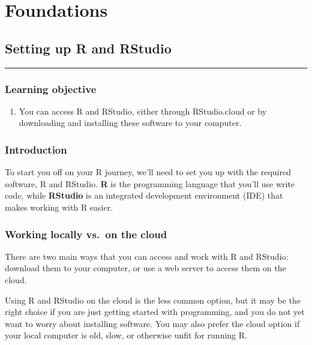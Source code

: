 \documentclass[
  letterpaper,
  DIV=11,
  numbers=noendperiod]{scrreprt}
\providecommand{\tightlist}{%
  \setlength{\itemsep}{0pt}\setlength{\parskip}{0pt}}\usepackage{longtable,booktabs,array}
\begin{document}
\part{Foundations}

\chapter{Setting up R and RStudio}\label{setting-up-r-and-rstudio}

\begin{center}\rule{0.5\linewidth}{0.5pt}\end{center}

\section*{Learning objective}\label{learning-objective}


\begin{enumerate}
\def\labelenumi{\arabic{enumi}.}
\tightlist
\item
  You can access R and RStudio, either through RStudio.cloud or by
  downloading and installing these software to your computer.
\end{enumerate}

\section{Introduction}\label{introduction-1}

To start you off on your R journey, we'll need to set you up with the
required software, R and RStudio. \textbf{R} is the programming language
that you'll use write code, while \textbf{RStudio} is an integrated
development environment (IDE) that makes working with R easier.

\section{Working locally vs.~on the
cloud}\label{working-locally-vs.-on-the-cloud}

There are two main ways that you can access and work with R and RStudio:
download them to your computer, or use a web server to access them on
the cloud.

Using R and RStudio on the cloud is the less common option, but it may
be the right choice if you are just getting started with programming,
and you do not yet want to worry about installing software. You may also
prefer the cloud option if your local computer is old, slow, or
otherwise unfit for running R.
\end{document}
